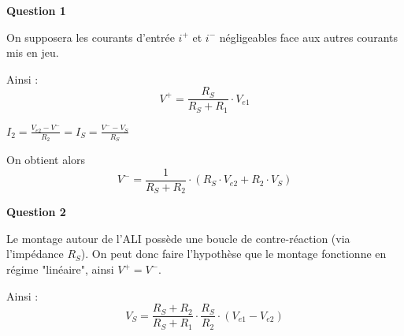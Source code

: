 \textbf{Question 1}

On supposera les courants d'entrée $i^+$ et $i^-$ négligeables face aux autres courants mis en jeu.

Ainsi : $$V^+ = \frac{R_S}{R_S + R_1} \cdot V_{e1}$$

$I_2 = \frac{V_{e2} - V^-}{R_2} = I_S = \frac{V^- - V_S}{R_S}$

\medskip

On obtient alors $$V^- = \frac{1}{R_S + R_2} \cdot (R_S \cdot V_{e2} + R_2 \cdot V_S)$$

\medskip

\textbf{Question 2}

Le montage autour de l'ALI possède une boucle de contre-réaction (via l'impédance $R_S$). On peut donc faire l'hypothèse que le montage fonctionne en régime "linéaire", ainsi $V^+ = V^-$.

Ainsi : $$\boxed{V_S = \frac{R_S + R_2}{R_S + R_1} \cdot \frac{R_S}{R_2} \cdot (V_{e1} - V_{e2})}$$

